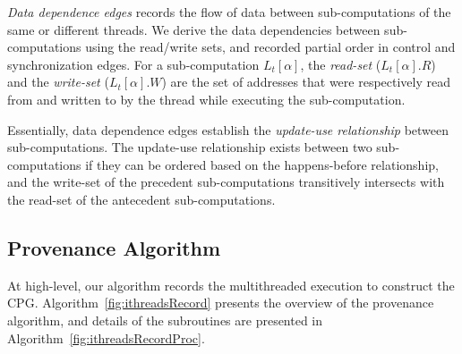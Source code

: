   {\em Data dependence edges}  records the flow of data between sub-computations of the same or different threads. 
 We derive the data dependencies between sub-computations using the read/write sets, and recorded partial order in control and synchronization edges. For a sub-computation $L_t[\alpha]$, the {\em read-set}
($L_t[\alpha].R$) and the {\em write-set} ($L_t[\alpha].W$) are the set of
addresses that were respectively read from and written to by
the thread while executing the sub-computation. 

Essentially, data dependence edges establish the {\em update-use relationship} between sub-computations. The update-use relationship exists between two sub-computations if they can be  ordered based on the happens-before relationship, and the write-set of the  precedent  sub-computations transitively intersects with the read-set of the antecedent sub-computations. 







 
 
 \subsection{ Provenance Algorithm}
 \label{subsec:prov-algo}

 
 
At high-level, our algorithm records the multithreaded execution to construct the CPG.
Algorithm~\ref{fig:ithreadsRecord} presents the overview of the provenance algorithm, and details of the subroutines are presented in Algorithm~\ref{fig:ithreadsRecordProc}.
  

